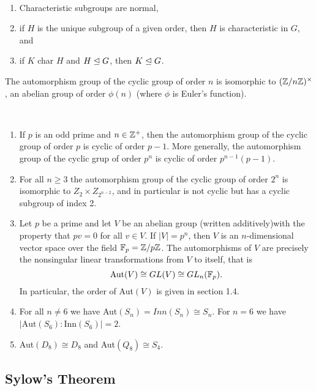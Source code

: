 \documentclass[../main]{subfiles}
\begin{document}
 
 \begin{nt}
  ~\begin{enumerate}
    \item Characteristic subgroups are normal,
    \item if $H$ is the unique subgroup of a given order, then $H$ is characteristic in $G$, and
    \item if $K$ char $H$ and $H \trianglelefteq G$, then $K \trianglelefteq G$.
   \end{enumerate}
 \end{nt}

 
 \begin{prop}
  The automorphism group of the cyclic group of order $n$ is isomorphic to $(\mathbb{Z}/n\mathbb{Z})^\times$, an abelian group of order $\phi(n)$ (where $\phi$ is Euler's function).
 \end{prop}
 
 
 \begin{prop}
  ~\begin{enumerate}
    \item If $p$ is an odd prime and $n \in \mathbb{Z}^+$, then the automorphism group of the cyclic group of order $p$ is cyclic of order $p-1$. More generally, the automorphism group of the cyclic grup of order $p^n$ is cyclic of order $p^{n-1}(p-1)$.
    \item For all $n\geq 3$ the automorphism group of the cyclic group of order $2^n$ is isomorphic to $Z_2 \times Z_{2^{n-2}}$, and in particular is not cyclic but has a cyclic subgroup of index 2.
    \item Let $p$ be a prime and let $V$  be an abelian group (written additively)with the property that $pv=0$ for all $v\in V$. If $|V|=p^n$, then $V$ is an $n$-dimensional vector space over the field $\mathbb{F}_p = \mathbb{Z}/p\mathbb{Z}$. The automorphisms of $V$ are precisely the nonsingular linear transformations from $V$ to itself, that is 
    \[\text{Aut}(V) \cong GL(V) \cong GL_n(\mathbb{F}_p).\]
    In particular, the order of Aut$(V)$ is given in section 1.4.
    \item For all $n \neq 6$ we have Aut$(S_n) = Inn(S_n) \cong S_n$. For $n = 6$ we have \\ $|\text{Aut}(S_6):\text{Inn}(S_6)| = 2$.
    \item Aut$(D_8) \cong D_8$ and Aut$(Q_8) \cong S_4$. 
   \end{enumerate}
 \end{prop}
 
 
 \subsection{Sylow's Theorem}















 
 
 
 
 
 
 
 
 
 
 
 
 
 
 
 
 
 
 
 
 
 
 
 
 
 
 
 
 
 
 
\end{document}

